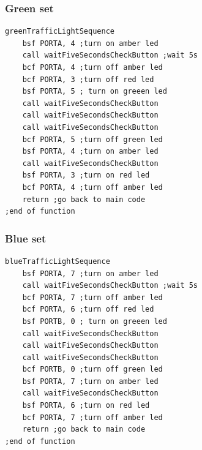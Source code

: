 \subsubsection*{Green set}
\begin{lstlisting}[language={[x86masm]Assembler}, style=assembly, caption=Green Traffic Light sequence]
greenTrafficLightSequence
	bsf PORTA, 4 ;turn on amber led
	call waitFiveSecondsCheckButton ;wait 5s
	bcf PORTA, 4 ;turn off amber led
	bcf PORTA, 3 ;turn off red led
	bsf PORTA, 5 ; turn on greeen led
	call waitFiveSecondsCheckButton
	call waitFiveSecondsCheckButton
	call waitFiveSecondsCheckButton
	bcf PORTA, 5 ;turn off green led
	bsf PORTA, 4 ;turn on amber led
	call waitFiveSecondsCheckButton
	bsf PORTA, 3 ;turn on red led
	bcf PORTA, 4 ;turn off amber led
	return ;go back to main code
;end of function
\end{lstlisting}

\subsubsection*{Blue set}
\begin{lstlisting}[language={[x86masm]Assembler}, style=assembly, caption=Blue Traffic Light sequence]
blueTrafficLightSequence
	bsf PORTA, 7 ;turn on amber led
	call waitFiveSecondsCheckButton ;wait 5s
	bcf PORTA, 7 ;turn off amber led
	bcf PORTA, 6 ;turn off red led
	bsf PORTB, 0 ; turn on greeen led
	call waitFiveSecondsCheckButton
	call waitFiveSecondsCheckButton
	call waitFiveSecondsCheckButton
	bcf PORTB, 0 ;turn off green led
	bsf PORTA, 7 ;turn on amber led
	call waitFiveSecondsCheckButton
	bsf PORTA, 6 ;turn on red led
	bcf PORTA, 7 ;turn off amber led
	return ;go back to main code
;end of function
\end{lstlisting}